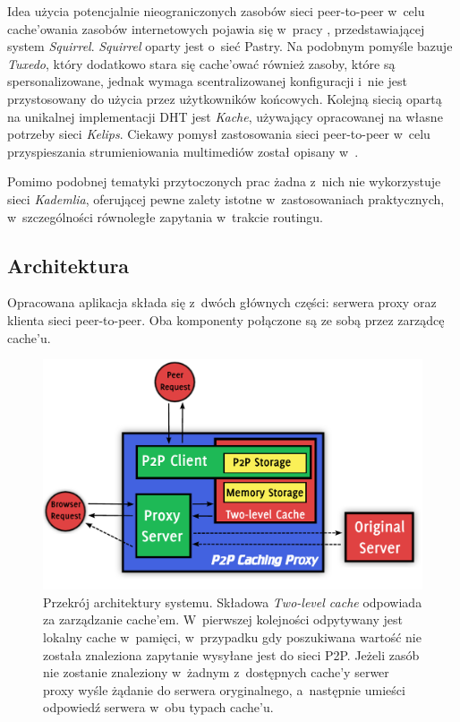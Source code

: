 \documentclass[a4paper,11pt]{scrartcl}
\newcommand{\s}{ }
\newcommand{\kesz}{cache}
\newcommand{\keszy}{cache'y}
\newcommand{\keszem}{cache'em}
\newcommand{\keszu}{cache'u}
\newcommand{\keszowac}{cache'ować}
\newcommand{\keszowania}{cache'owania}
\begin{document}
Idea użycia potencjalnie nieograniczonych zasobów sieci peer-to-peer w~celu \keszowania\s zasobów internetowych pojawia się w~pracy \cite{iyer2002squirrel, clevenot2004simple}, przedstawiającej system \textit{Squirrel}. \textit{Squirrel} oparty jest o~sieć Pastry\cite{rowstron2001pastry}. 
Na podobnym pomyśle bazuje \textit{Tuxedo}\cite{shi2003tuxedo}, który dodatkowo stara się \keszowac\s również zasoby, które są spersonalizowane, jednak wymaga scentralizowanej konfiguracji i~nie jest przystosowany do użycia przez użytkowników końcowych. 
Kolejną siecią opartą na unikalnej implementacji DHT jest \textit{Kache}\cite{linga2004kache}, używający opracowanej na własne potrzeby sieci \textit{Kelips}.
Ciekawy pomysł zastosowania sieci peer-to-peer w~celu przyspieszania strumieniowania multimediów został opisany w~\cite{guo2006design}.

Pomimo podobnej tematyki przytoczonych prac żadna z~nich nie wykorzystuje sieci \textit{Kademlia}, oferującej pewne zalety istotne w~zastosowaniach praktycznych, w~szczególności równoległe zapytania w~trakcie routingu.

\subsection{Architektura}
\label{sect_architecture}
Opracowana aplikacja składa się z~dwóch głównych części: serwera proxy oraz klienta sieci peer-to-peer. Oba komponenty połączone są ze sobą przez zarządcę \keszu.

\begin{figure}[h!]
\centering
\includegraphics[width=0.9\linewidth]{img/architecture.pdf}
\caption{Przekrój architektury systemu. Składowa \textit{Two-level cache} odpowiada za zarządzanie \keszem. W~pierwszej kolejności odpytywany jest lokalny \kesz\s w~pamięci, w~przypadku gdy poszukiwana wartość nie została znaleziona zapytanie wysyłane jest do sieci P2P. Jeżeli zasób nie zostanie znaleziony w~żadnym z~dostępnych \keszy\s serwer proxy wyśle żądanie do serwera oryginalnego, a~następnie umieści odpowiedź serwera w~obu typach \keszu.}
\label{fig_architecture}
\end{figure}
\end{document}
